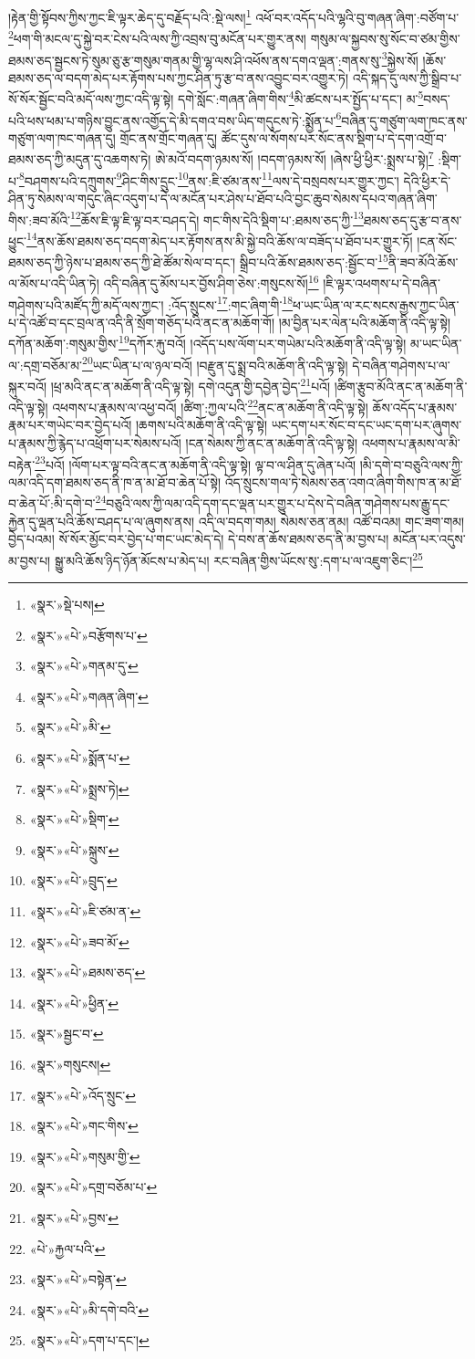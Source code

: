 །རྟེན་གྱི་སྟོབས་ཀྱིས་ཀྱང་ཇི་ལྟར་ཆེད་དུ་བརྗོད་པའི་:སྡེ་ལས།\footnote{«སྣར་»སྡེ་པས།} འཕོ་བར་འདོད་པའི་ལྷའི་བུ་གཞན་ཞིག་:བཙོག་པ་\footnote{«སྣར་»«པེ་»བརྩོགས་པ་}ཕག་གི་མངལ་དུ་སྐྱེ་བར་ངེས་པའི་ལས་ཀྱི་འབྲས་བུ་མངོན་པར་གྱུར་ནས། གསུམ་ལ་སྐྱབས་སུ་སོང་བ་ཙམ་གྱིས་ཐམས་ཅད་སྦྱངས་ཏེ་སུམ་ཅུ་རྩ་གསུམ་གནམ་གྱི་ལྷ་ལས་ཤི་འཕོས་ནས་དགའ་ལྡན་:གནས་སུ་\footnote{«སྣར་»«པེ་»གནམ་དུ་}སྐྱེས་སོ། །ཆོས་ཐམས་ཅད་ལ་བདག་མེད་པར་རྟོགས་པས་ཀྱང་ཤིན་ཏུ་རྩ་བ་ནས་འབྱུང་བར་འགྱུར་ཏེ། འདི་སྐད་དུ་ལས་ཀྱི་སྒྲིབ་པ་སོ་སོར་སྦྱོང་བའི་མདོ་ལས་ཀྱང་འདི་ལྟ་སྟེ། དགེ་སློང་:གཞན་ཞིག་གིས་\footnote{«སྣར་»«པེ་»གཞན་ཞིག་}མི་ཚངས་པར་སྤྱོད་པ་དང་། མ་\footnote{«སྣར་»«པེ་»མི་}བསད་པའི་ཕས་ཕམ་པ་གཉིས་བྱུང་ནས་འགྱོད་དེ་མི་དགའ་བས་ཡིད་གདུངས་ཏེ་:སྨྱོན་པ་\footnote{«སྣར་»«པེ་»སྨོན་པ་}བཞིན་དུ་གཙུག་ལག་ཁང་ནས་གཙུག་ལག་ཁང་གཞན་དུ། གྲོང་ནས་གྲོང་གཞན་དུ། ཚོང་དུས་ལ་སོགས་པར་སོང་ནས་སྡིག་པ་དེ་དག་འགྲོ་བ་ཐམས་ཅད་ཀྱི་མདུན་དུ་འཆགས་ཏེ། ཨེ་མའོ་བདག་ཉམས་སོ། །བདག་ཉམས་སོ། །ཞེས་ཕྱི་ཕྱིར་:སྨྲས་པ་སྟེ།\footnote{«སྣར་»«པེ་»སྨྲས་ཏེ།} :སྡིག་པ་\footnote{«སྣར་»«པེ་»སྡིག་}བཤགས་པའི་དཀྲུགས་\footnote{«སྣར་»«པེ་»སྐྲུས་}ཤིང་གིས་དྲུང་\footnote{«སྣར་»«པེ་»བྲུད་}ནས་:ཇི་ཙམ་ནས་\footnote{«སྣར་»«པེ་»ཇི་ཙམ་ན་}ལས་དེ་བསྲབས་པར་གྱུར་ཀྱང་། དེའི་ཕྱིར་དེ་ཤིན་ཏུ་སེམས་ལ་གདུང་ཞིང་འདུག་པ་དེ་ལ་མངོན་པར་ཤེས་པ་ཐོབ་པའི་བྱང་ཆུབ་སེམས་དཔའ་གཞན་ཞིག་གིས་:ཟབ་མོའི་\footnote{«སྣར་»«པེ་»ཟབ་མོ་}ཆོས་ཇི་ལྟ་ཇི་ལྟ་བར་བཤད་དེ། གང་གིས་དེའི་སྡིག་པ་:ཐམས་ཅད་ཀྱི་\footnote{«སྣར་»«པེ་»ཐམས་ཅད་}ཐམས་ཅད་དུ་རྩ་བ་ནས་ཕྱུང་\footnote{«སྣར་»«པེ་»ཕྱིན་}ནས་ཆོས་ཐམས་ཅད་བདག་མེད་པར་རྟོགས་ནས་མི་སྐྱེ་བའི་ཆོས་ལ་བཟོད་པ་ཐོབ་པར་གྱུར་ཏོ། །ངན་སོང་ཐམས་ཅད་ཀྱི་ཉེས་པ་ཐམས་ཅད་ཀྱི་ཐེ་ཚོམ་སེལ་བ་དང་། སྒྲིབ་པའི་ཆོས་ཐམས་ཅད་:སྦྱོང་བ་\footnote{«སྣར་»སྦྱང་བ་}ནི་ཟབ་མོའི་ཆོས་ལ་མོས་པ་འདི་ཡིན་ཏེ། འདི་བཞིན་དུ་མོས་པར་བྱོས་ཤིག་ཅེས་:གསུངས་སོ།\footnote{«སྣར་»གསུངས།} །ཇི་ལྟར་འཕགས་པ་དེ་བཞིན་གཤེགས་པའི་མཛོད་ཀྱི་མདོ་ལས་ཀྱང་། :འོད་སྲུངས་\footnote{«སྣར་»«པེ་»འོད་སྲུང་}:གང་ཞིག་གི་\footnote{«སྣར་»«པེ་»གང་གིས་}ཕ་ཡང་ཡིན་ལ་རང་སངས་རྒྱས་ཀྱང་ཡིན་པ་དེ་འཚོ་བ་དང་བྲལ་ན་འདི་ནི་སྲོག་གཅོད་པའི་ནང་ན་མཆོག་གོ། །མ་བྱིན་པར་ལེན་པའི་མཆོག་ནི་འདི་ལྟ་སྟེ། དཀོན་མཆོག་:གསུམ་གྱིས་\footnote{«སྣར་»«པེ་»གསུམ་གྱི་}དཀོར་རྐུ་བའོ། །འདོད་པས་ལོག་པར་གཡེམ་པའི་མཆོག་ནི་འདི་ལྟ་སྟེ། མ་ཡང་ཡིན་ལ་:དགྲ་བཅོམ་མ་\footnote{«སྣར་»«པེ་»དགྲ་བཅོམ་པ་}ཡང་ཡིན་པ་ལ་ཉལ་བའོ། །བརྫུན་དུ་སྨྲ་བའི་མཆོག་ནི་འདི་ལྟ་སྟེ། དེ་བཞིན་གཤེགས་པ་ལ་སྐུར་བའོ། །ཕྲ་མའི་ནང་ན་མཆོག་ནི་འདི་ལྟ་སྟེ། དགེ་འདུན་གྱི་དབྱེན་བྱེད་\footnote{«སྣར་»«པེ་»བྱས་}པའོ། །ཚིག་རྩུབ་མོའི་ནང་ན་མཆོག་ནི་འདི་ལྟ་སྟེ། འཕགས་པ་རྣམས་ལ་འཕྱ་བའོ། །ཚིག་:ཀྱལ་པའི་\footnote{«པེ་»རྐྱལ་པའི་}ནང་ན་མཆོག་ནི་འདི་ལྟ་སྟེ། ཆོས་འདོད་པ་རྣམས་རྣམ་པར་གཡེང་བར་བྱེད་པའོ། །ཆགས་པའི་མཆོག་ནི་འདི་ལྟ་སྟེ། ཡང་དག་པར་སོང་བ་དང་ཡང་དག་པར་ཞུགས་པ་རྣམས་ཀྱི་རྙེད་པ་འཕྲོག་པར་སེམས་པའོ། །ངན་སེམས་ཀྱི་ནང་ན་མཆོག་ནི་འདི་ལྟ་སྟེ། འཕགས་པ་རྣམས་ལ་མི་བརྟེན་\footnote{«སྣར་»«པེ་»བསྟེན་}པའོ། །ལོག་པར་ལྟ་བའི་ནང་ན་མཆོག་ནི་འདི་ལྟ་སྟེ། ལྟ་བ་ལ་ཤིན་དུ་ཞེན་པའོ། །མི་དགེ་བ་བཅུའི་ལས་ཀྱི་ལམ་འདི་དག་ཐམས་ཅད་ནི་ཁ་ན་མ་ཐོ་བ་ཆེན་པོ་སྟེ། འོད་སྲུངས་གལ་ཏེ་སེམས་ཅན་འགའ་ཞིག་གིས་ཁ་ན་མ་ཐོ་བ་ཆེན་པོ་:མི་དགེ་བ་\footnote{«སྣར་»«པེ་»མི་དགེ་བའི་}བཅུའི་ལས་ཀྱི་ལམ་འདི་དག་དང་ལྡན་པར་གྱུར་པ་དེས་དེ་བཞིན་གཤེགས་པས་རྒྱུ་དང་རྐྱེན་དུ་ལྡན་པའི་ཆོས་བཤད་པ་ལ་ཞུགས་ནས། འདི་ལ་བདག་གམ། སེམས་ཅན་ནམ། འཚོ་བའམ། གང་ཟག་གམ། བྱེད་པའམ། སོ་སོར་མྱོང་བར་བྱེད་པ་གང་ཡང་མེད་དེ། དེ་བས་ན་ཆོས་ཐམས་ཅད་ནི་མ་བྱས་པ། མངོན་པར་འདུས་མ་བྱས་པ། སྒྱུ་མའི་ཆོས་ཉིད་ཉོན་མོངས་པ་མེད་པ། རང་བཞིན་གྱིས་ཡོངས་སུ་:དག་པ་ལ་འཇུག་ཅིང་།\footnote{«སྣར་»«པེ་»དག་པ་དང་།} 